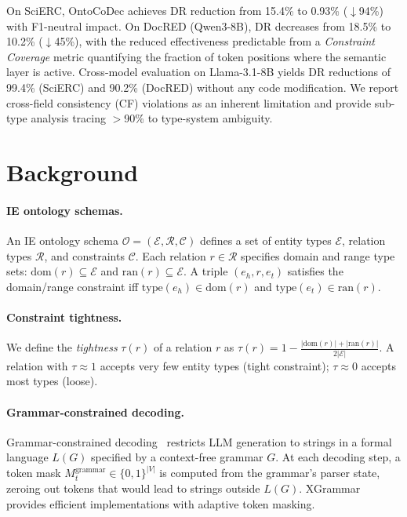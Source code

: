 \documentclass[11pt,a4paper]{article}
\newcommand{\sys}{OntoCoDec\xspace}
\begin{document}
On SciERC, \sys achieves DR reduction from 15.4\% to 0.93\% ($\downarrow$94\%) with F1-neutral impact.
On DocRED (Qwen3-8B), DR decreases from 18.5\% to 10.2\% ($\downarrow$45\%), with the reduced effectiveness predictable from a \emph{Constraint Coverage} metric quantifying the fraction of token positions where the semantic layer is active.
Cross-model evaluation on Llama-3.1-8B yields DR reductions of 99.4\% (SciERC) and 90.2\% (DocRED) without any code modification.
We report cross-field consistency (CF) violations as an inherent limitation and provide sub-type analysis tracing $>$90\% to type-system ambiguity.

\section{Background}
\label{sec:background}

\paragraph{IE ontology schemas.}
An IE ontology schema $\mathcal{O} = (\mathcal{E}, \mathcal{R}, \mathcal{C})$ defines a set of entity types $\mathcal{E}$, relation types $\mathcal{R}$, and constraints $\mathcal{C}$.
Each relation $r \in \mathcal{R}$ specifies domain and range type sets: $\text{dom}(r) \subseteq \mathcal{E}$ and $\text{ran}(r) \subseteq \mathcal{E}$.
A triple $(e_h, r, e_t)$ satisfies the domain/range constraint iff $\text{type}(e_h) \in \text{dom}(r)$ and $\text{type}(e_t) \in \text{ran}(r)$.

\paragraph{Constraint tightness.}
We define the \emph{tightness} $\tau(r)$ of a relation $r$ as $\tau(r) = 1 - \frac{|\text{dom}(r)| + |\text{ran}(r)|}{2|\mathcal{E}|}$.
A relation with $\tau \approx 1$ accepts very few entity types (tight constraint); $\tau \approx 0$ accepts most types (loose).

\paragraph{Grammar-constrained decoding.}
Grammar-constrained decoding~\citep{willard2023efficient,dong2024xgrammar} restricts LLM generation to strings in a formal language $L(G)$ specified by a context-free grammar $G$.
At each decoding step, a token mask $M_t^{\text{grammar}} \in \{0,1\}^{|V|}$ is computed from the grammar's parser state, zeroing out tokens that would lead to strings outside $L(G)$.
XGrammar~\citep{dong2024xgrammar} provides efficient implementations with adaptive token masking.
\end{document}
